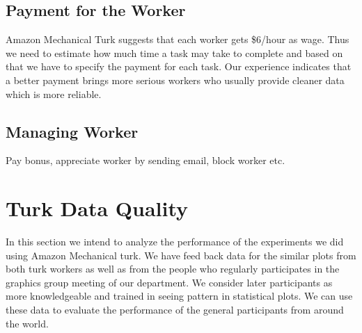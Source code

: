 \documentclass[11pt]{article}
\begin{document}

\subsection{Payment for the Worker}Amazon Mechanical Turk suggests that each worker gets \$6/hour as wage. Thus we need to estimate how much time a task may take to complete and based on that we have to specify the payment for each task. Our experience indicates that a better payment brings more serious workers who usually provide cleaner data which is more reliable. 


\subsection{Managing Worker} Pay bonus, appreciate worker by sending email, block worker etc.

\section{Turk Data Quality} \label{sec:turk_data}

In this section we intend to analyze the performance of the experiments we did using Amazon Mechanical turk. We have feed back data for the similar plots from both turk workers as well as from the people who regularly participates in the graphics group meeting of our department. We consider later participants as more knowledgeable and trained in seeing pattern in statistical plots. We can use these data to evaluate the performance of the general participants from around the world.
\end{document}
